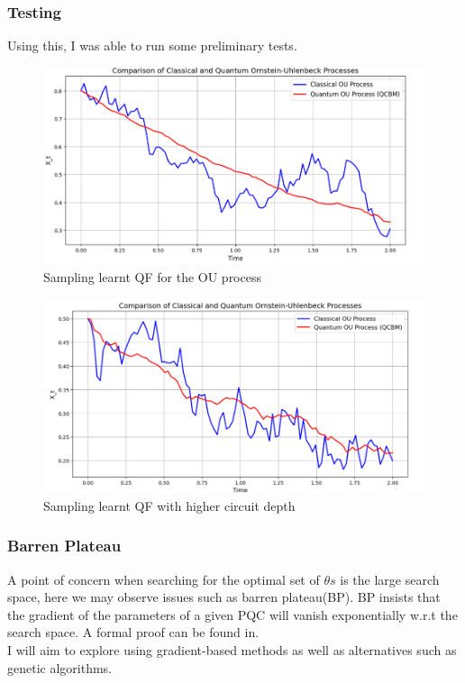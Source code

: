 \documentclass[12pt]{article}
\numberwithin{equation}{section}
\begin{document}
\subsubsection{Testing}
Using this, I was able to run some preliminary tests.
\begin{figure}[h]
    \centering
    \includegraphics[scale=0.7]{Quantile1.png}
    \caption{Sampling learnt QF for the OU process}
\end{figure}
\begin{figure}[h]
    \centering
    \includegraphics[scale=0.7]{Quantile2.png}
    \caption{Sampling learnt QF with higher circuit depth}
\end{figure}

\subsubsection{Barren Plateau}
A point of concern when searching for the optimal set of $\theta s$ is the large search space, here we may observe issues such as barren plateau(BP). BP 
insists that the gradient of the parameters of a given PQC will vanish exponentially 
w.r.t the search space. A formal proof can be found in\autocite{ragone_2024_a}. 
\\ 
I will aim to explore using gradient-based methods as well as alternatives such 
as genetic algorithms. 
\end{document}
